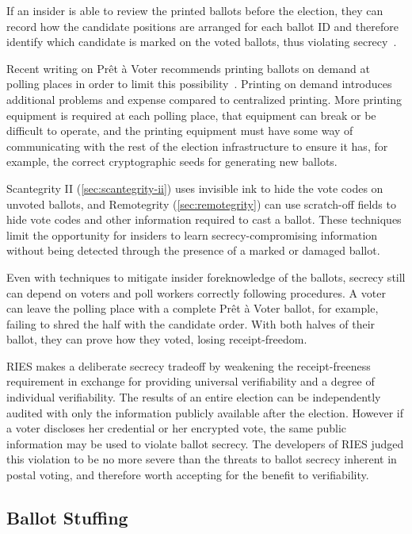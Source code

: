 If an insider is able to review the printed ballots before the
election, they can record how the candidate positions are arranged for
each ballot ID and therefore identify which candidate is marked on the
voted ballots, thus violating secrecy~\cite{burton2012}.

Recent writing on Prêt à Voter recommends printing ballots on demand
at polling places in order to limit this
possibility~\cite{ryan2009}. Printing on demand introduces additional
problems and expense compared to centralized printing. More printing
equipment is required at each polling place, that equipment can break
or be difficult to operate, and the printing equipment must have some
way of communicating with the rest of the election infrastructure to
ensure it has, for example, the correct cryptographic seeds for
generating new ballots.

Scantegrity II (\ref{sec:scantegrity-ii}) uses invisible ink to hide
the vote codes on unvoted ballots, and Remotegrity
(\ref{sec:remotegrity}) can use scratch-off fields to hide vote codes
and other information required to cast a ballot. These techniques
limit the opportunity for insiders to learn secrecy-compromising
information without being detected through the presence of a marked or
damaged ballot.

Even with techniques to mitigate insider foreknowledge of the ballots,
secrecy still can depend on voters and poll workers correctly
following procedures. A voter can leave the polling place with a
complete Prêt à Voter ballot, for example, failing to shred the half
with the candidate order. With both halves of their ballot, they can
prove how they voted, losing receipt-freedom.

RIES makes a deliberate secrecy tradeoff by weakening the
receipt-freeness requirement in exchange for providing universal
verifiability and a degree of individual verifiability. The results of
an entire election can be independently audited with only the
information publicly available after the election. However if a voter
discloses her credential or her encrypted vote, the same public
information may be used to violate ballot secrecy. The developers of
RIES judged this violation to be no more severe than the threats to
ballot secrecy inherent in postal voting, and therefore worth
accepting for the benefit to verifiability.

\subsection{Ballot Stuffing}

